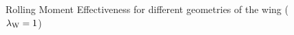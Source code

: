 \begin{figure}[H]
\centering
{} \\
 \\
\caption[Rolling Moment Effectiveness for $\lambdaW = 1$] {Rolling Moment Effectiveness for different geometries of the wing ($\lambdaW = 1$)}
\label{rme1}
\end{figure}

